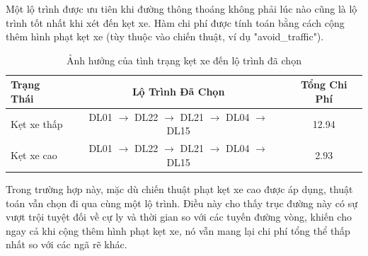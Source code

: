 Một lộ trình được ưu tiên khi đường thông thoáng không phải lúc nào cũng là lộ trình tốt nhất khi xét đến kẹt xe. Hàm chi phí được tính toán bằng cách cộng thêm hình phạt kẹt xe (tùy thuộc vào chiến thuật, ví dụ "avoid\_traffic").

\begin{table}[h!]
\centering
\caption{Ảnh hưởng của tình trạng kẹt xe đến lộ trình đã chọn}
\begin{tabular}{lcc}
\toprule
Trạng Thái & Lộ Trình Đã Chọn & Tổng Chi Phí \\
\midrule
Kẹt xe thấp & DL01 $\rightarrow$ DL22 $\rightarrow$ DL21 $\rightarrow$ DL04 $\rightarrow$ DL15 & 12.94 \\
Kẹt xe cao & DL01 $\rightarrow$ DL22 $\rightarrow$ DL21 $\rightarrow$ DL04 $\rightarrow$ DL15 & 2.93 \\
\bottomrule
\end{tabular}
\end{table}

Trong trường hợp này, mặc dù chiến thuật phạt kẹt xe cao được áp dụng, thuật toán vẫn chọn đi qua cùng một lộ trình. Điều này cho thấy trục đường này có sự vượt trội tuyệt đối về cự ly và thời gian so với các tuyến đường vòng, khiến cho ngay cả khi cộng thêm hình phạt kẹt xe, nó vẫn mang lại chi phí tổng thể thấp nhất so với các ngã rẽ khác.
